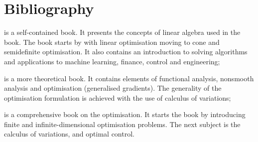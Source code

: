 \chapter{Bibliography}
\minitoc

\begin{description}
	\item \citep{CalafioreGhaoui2014} is a self-contained book. It presents the concepts of linear algebra used in the book. The book starts by with linear optimisation moving to cone and semidefinite optimisation. It also contains an introduction to solving algorithms and applications to machine learning, finance, control and engineering;
	
	\item \citep{Clarke:2013} is a more theoretical book. It contains elements of functional analysis, nonsmooth analysis and optimisation (generalised gradients). The generality of the optimisation formulation is achieved with the use of calculus of variations;
	
	\item \citep{Liberzon2012} is a comprehensive book on the optimisation. It starts the book by introducing finite and infinite-dimensional optimisation problems. The next subject is the calculus of variations, and optimal control.

	\item \citep{VandenbergheBoyd1996}
\end{description}


\clearpage
\printbibliography[segment=\therefsegment,heading=subbibintoc]